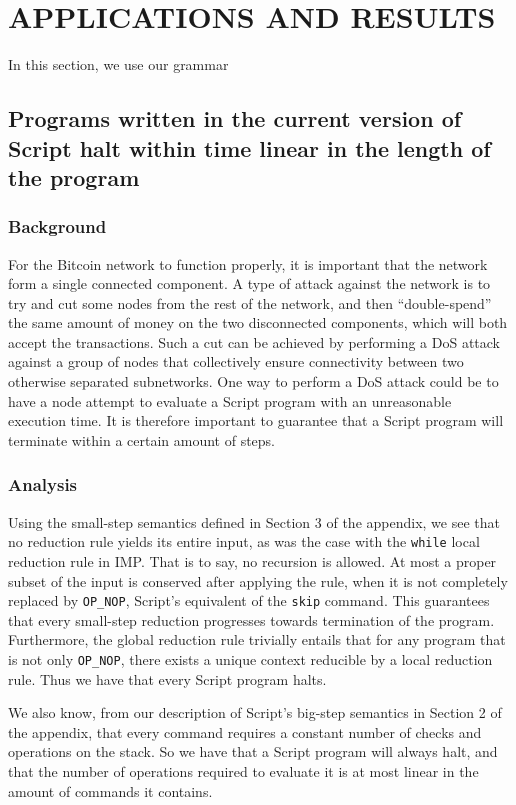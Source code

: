 \documentclass[letterpaper, 10 pt, conference]{ieeeconf}
\begin{document}
\section{APPLICATIONS AND RESULTS}

In this section, we use our grammar 

\subsection{Programs written in the current version of Script halt within time linear in the length of the program}

\subsubsection{Background}
For the Bitcoin network to function properly, it is important that the network form a single connected component. A type of attack against the network is to try and cut some nodes from the rest of the network, and then ``double-spend'' the same amount of money on the two disconnected components, which will both accept the transactions. Such a cut can be achieved by performing a DoS attack against a group of nodes that collectively ensure connectivity between two otherwise separated subnetworks. One way to perform a DoS attack could be to have a node attempt to evaluate a Script program with an unreasonable execution time. It is therefore important to guarantee that a Script program will terminate within a certain amount of steps.

\subsubsection{Analysis}
Using the small-step semantics defined in Section 3 of the appendix, we see that no reduction rule yields its entire input, as was the case with the \texttt{while} local reduction rule in IMP. That is to say, no recursion is allowed. At most a proper subset of the input is conserved after applying the rule, when it is not completely replaced by \texttt{OP\_NOP}, Script's equivalent of the \texttt{skip} command. This guarantees that every small-step reduction progresses towards termination of the program. Furthermore, the global reduction rule trivially entails that for any program that is not only \texttt{OP\_NOP}, there exists a unique context reducible by a local reduction rule. Thus we have that every Script program halts.

We also know, from our description of Script's big-step semantics in Section 2 of the appendix, that every command requires a constant number of checks and operations on the stack. So we have that a Script program will always halt, and that the number of operations required to evaluate it is at most linear in the amount of commands it contains.
\end{document}
